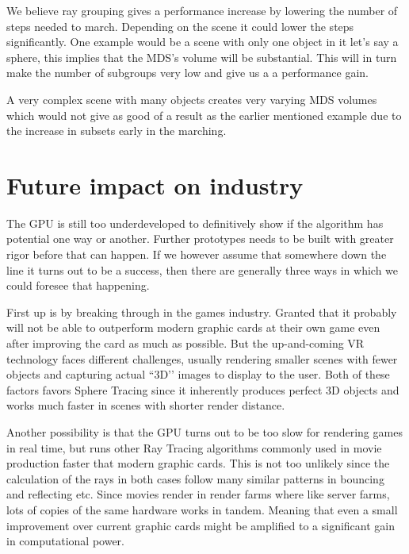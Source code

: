 			We believe ray grouping gives a performance increase by lowering
			the number of steps needed to march. Depending on the scene it
			could lower the steps significantly. One example would be a scene
			with only one object in it let's say a sphere, this implies that
			the MDS's volume will be substantial. This will in turn make the
			number of subgroups very low and give us a a performance gain. 
			
			A very complex scene with many objects creates very varying MDS
			volumes which would not give as good of a result as the earlier
			mentioned example due to the increase in subsets early in the
			marching.

	\section{Future impact on industry} 

		The GPU is still too underdeveloped to definitively show if the algorithm
		has potential one way or another.  Further prototypes needs to be built
		with greater rigor before that can happen. If we however assume that
		somewhere down the line it turns out to be a success, then there are
		generally three ways in which we could foresee that happening.

		First up is by breaking through in the games industry. Granted that it
		probably will not be able to outperform modern graphic cards at their own
		game even after improving the card as much as possible. But the
		up-and-coming VR technology faces different challenges, usually rendering
		smaller scenes with fewer objects and capturing actual ``3D’’ images to
		display to the user. Both of these factors favors Sphere Tracing since it
		inherently produces perfect 3D objects and works much faster in scenes with
		shorter render distance.

		Another possibility is that the GPU turns out to be too slow for
		rendering games in real time, but runs other Ray Tracing algorithms
		commonly used in movie production faster that modern graphic cards.
		This is not too unlikely since the calculation of the rays in both
		cases follow many similar patterns in bouncing and reflecting etc.
		Since movies render in render farms where like server farms, lots of
		copies of the same hardware works in tandem. Meaning that even a small
		improvement over current graphic cards might be amplified to a
		significant gain in computational power.

